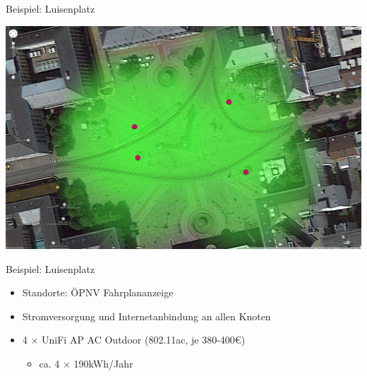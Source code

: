 \documentclass{beamer}
\begin{document}
\begin{frame}{Beispiel: Luisenplatz}
\begin{center}
\includegraphics[height=0.7\textheight]{images/map_luisenplatz_3}
\end{center}
\end{frame}

\begin{frame}{Beispiel: Luisenplatz}
\vfill
\begin{itemize}
\item Standorte: ÖPNV Fahrplananzeige
\item Stromversorgung und Internetanbindung an allen Knoten
\item 4 $\times$ UniFi AP AC Outdoor (802.11ac, je 380-400\euro{})
	\begin{itemize}
	\item ca. 4 $\times$ 190kWh/Jahr
	\end{itemize}
\end{itemize}
\vfill
\end{frame}
\end{document}
